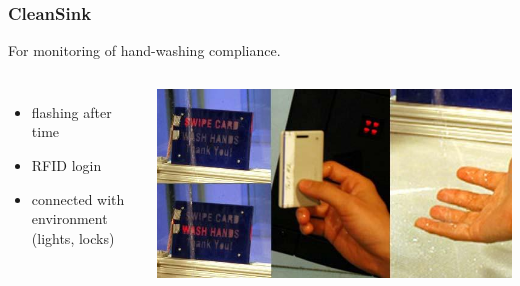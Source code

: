 \documentclass{beamer}
\begin{document}
\begin{frame}
  \frametitle{CleanSink}
  For monitoring of hand-washing compliance.
  \begin{columns}[c]
    \begin{itemize}
    \item flashing after time
    \item RFID login
    \item connected with environment\\(lights, locks)
    \end{itemize}
    \includegraphics[width=\textwidth]{Bilder/CleanSink.jpg}
  \end{columns}

\end{frame}
\end{document}
